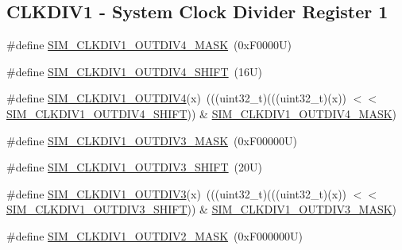 \subsection*{C\+L\+K\+D\+I\+V1 -\/ System Clock Divider Register 1}
\begin{DoxyCompactItemize}
\item 
\#define \mbox{\hyperlink{group___s_i_m___register___masks_gaa2a972171bb5a662e1b4993b042f7180}{S\+I\+M\+\_\+\+C\+L\+K\+D\+I\+V1\+\_\+\+O\+U\+T\+D\+I\+V4\+\_\+\+M\+A\+SK}}~(0x\+F0000\+U)
\item 
\#define \mbox{\hyperlink{group___s_i_m___register___masks_ga053a7a1ffc9f3b6834679c63ca0ebe29}{S\+I\+M\+\_\+\+C\+L\+K\+D\+I\+V1\+\_\+\+O\+U\+T\+D\+I\+V4\+\_\+\+S\+H\+I\+FT}}~(16\+U)
\item 
\#define \mbox{\hyperlink{group___s_i_m___register___masks_ga4e380b274f15fdde19e4fbd5c341a728}{S\+I\+M\+\_\+\+C\+L\+K\+D\+I\+V1\+\_\+\+O\+U\+T\+D\+I\+V4}}(x)~(((uint32\+\_\+t)(((uint32\+\_\+t)(x)) $<$$<$ \mbox{\hyperlink{group___s_i_m___register___masks_ga053a7a1ffc9f3b6834679c63ca0ebe29}{S\+I\+M\+\_\+\+C\+L\+K\+D\+I\+V1\+\_\+\+O\+U\+T\+D\+I\+V4\+\_\+\+S\+H\+I\+FT}})) \& \mbox{\hyperlink{group___s_i_m___register___masks_gaa2a972171bb5a662e1b4993b042f7180}{S\+I\+M\+\_\+\+C\+L\+K\+D\+I\+V1\+\_\+\+O\+U\+T\+D\+I\+V4\+\_\+\+M\+A\+SK}})
\item 
\#define \mbox{\hyperlink{group___s_i_m___register___masks_ga0a017e7ea9a2d31e9b23aa2cab06c19d}{S\+I\+M\+\_\+\+C\+L\+K\+D\+I\+V1\+\_\+\+O\+U\+T\+D\+I\+V3\+\_\+\+M\+A\+SK}}~(0x\+F00000\+U)
\item 
\#define \mbox{\hyperlink{group___s_i_m___register___masks_gab5533e40e65e365a9bb32edf707ac9f0}{S\+I\+M\+\_\+\+C\+L\+K\+D\+I\+V1\+\_\+\+O\+U\+T\+D\+I\+V3\+\_\+\+S\+H\+I\+FT}}~(20\+U)
\item 
\#define \mbox{\hyperlink{group___s_i_m___register___masks_gaeccf89240795d88d055b49719b820c14}{S\+I\+M\+\_\+\+C\+L\+K\+D\+I\+V1\+\_\+\+O\+U\+T\+D\+I\+V3}}(x)~(((uint32\+\_\+t)(((uint32\+\_\+t)(x)) $<$$<$ \mbox{\hyperlink{group___s_i_m___register___masks_gab5533e40e65e365a9bb32edf707ac9f0}{S\+I\+M\+\_\+\+C\+L\+K\+D\+I\+V1\+\_\+\+O\+U\+T\+D\+I\+V3\+\_\+\+S\+H\+I\+FT}})) \& \mbox{\hyperlink{group___s_i_m___register___masks_ga0a017e7ea9a2d31e9b23aa2cab06c19d}{S\+I\+M\+\_\+\+C\+L\+K\+D\+I\+V1\+\_\+\+O\+U\+T\+D\+I\+V3\+\_\+\+M\+A\+SK}})
\item 
\#define \mbox{\hyperlink{group___s_i_m___register___masks_gad2d7b5c991f6db7ab2a3e6bc4d9c6aae}{S\+I\+M\+\_\+\+C\+L\+K\+D\+I\+V1\+\_\+\+O\+U\+T\+D\+I\+V2\+\_\+\+M\+A\+SK}}~(0x\+F000000\+U)

\end{DoxyCompactItemize}
